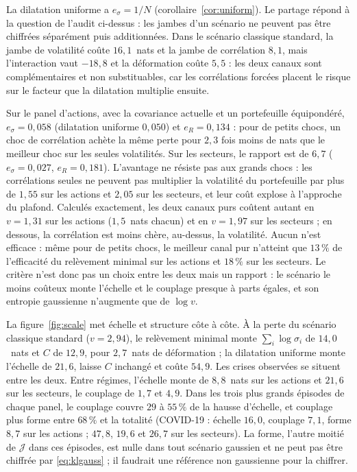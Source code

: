 \documentclass[12pt]{article}
\theoremstyle{definition}
\newcommand{\JJ}{\mathcal{J}}
\begin{document}
\begin{doublespace}
La dilatation uniforme a $e_\sigma=1/N$ (corollaire~\ref{cor:uniform}). Le
partage répond à la question de l'audit ci-dessus : les jambes d'un scénario
ne peuvent pas être chiffrées séparément puis additionnées. Dans le scénario
classique standard, la jambe de volatilité coûte $16{,}1$~nats et la jambe de
corrélation $8{,}1$, mais l'interaction vaut $-18{,}8$ et la déformation coûte
$5{,}5$ : les deux canaux sont complémentaires et non substituables, car les
corrélations forcées placent le risque sur le facteur que la dilatation
multiplie ensuite.

Sur le panel d'actions, avec la covariance actuelle et un portefeuille
équipondéré, $e_\sigma=0{,}058$ (dilatation uniforme $0{,}050$) et
$e_R=0{,}134$ : pour de petits chocs, un choc de corrélation achète la même
perte pour $2{,}3$ fois moins de nats que le meilleur choc sur les seules
volatilités. Sur les secteurs, le rapport est de $6{,}7$ ($e_\sigma=0{,}027$,
$e_R=0{,}181$). L'avantage ne résiste pas aux grands chocs : les corrélations
seules ne peuvent pas multiplier la volatilité du portefeuille par plus de
$1{,}55$ sur les actions et $2{,}05$ sur les secteurs, et leur coût explose à
l'approche du plafond. Calculés exactement, les deux canaux purs coûtent autant
en $v=1{,}31$ sur les actions ($1{,}5$~nats chacun) et en $v=1{,}97$ sur les
secteurs ; en dessous, la corrélation est moins chère, au-dessus, la
volatilité. Aucun n'est efficace : même pour de petits chocs, le meilleur
canal pur n'atteint que $13\,\%$ de l'efficacité du relèvement minimal sur
les actions et $18\,\%$ sur les secteurs. Le critère n'est donc pas un choix
entre les deux mais un rapport : le scénario le moins coûteux monte l'échelle
et le couplage presque à parts égales, et son entropie gaussienne n'augmente
que de $\log v$.

La figure~\ref{fig:scale} met échelle et structure côte à côte. À la perte du
scénario classique standard ($v=2{,}94$), le relèvement minimal monte
$\sum_i\log\sigma_i$ de $14{,}0$~nats et $C$ de $12{,}9$, pour $2{,}7$~nats de
déformation ; la dilatation uniforme monte l'échelle de $21{,}6$, laisse $C$
inchangé et coûte $54{,}9$. Les crises observées se situent entre les deux.
Entre régimes, l'échelle monte de $8{,}8$~nats sur les actions et $21{,}6$ sur
les secteurs, le couplage de $1{,}7$ et $4{,}9$. Dans les trois plus grands
épisodes de chaque panel, le couplage couvre $29$ à $55\,\%$ de la hausse
d'échelle, et couplage plus forme entre $68\,\%$ et la totalité (COVID-19 :
échelle $16{,}0$, couplage $7{,}1$, forme $8{,}7$ sur les actions ; $47{,}8$,
$19{,}6$ et $26{,}7$ sur les secteurs). La forme, l'autre moitié de $\JJ$ dans
ces épisodes, est nulle dans tout scénario gaussien et ne peut pas être
chiffrée par \eqref{eq:klgauss} ; il faudrait une référence non gaussienne
pour la chiffrer.


\end{doublespace}
\end{document}
